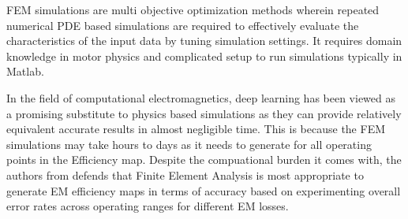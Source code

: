\documentclass{report} %
\begin{document}
\ac{FEM} simulations are multi objective optimization methods wherein repeated numerical \ac{PDE} based simulations
 are required to effectively evaluate the characteristics of the input data by tuning simulation settings. 
 It requires domain knowledge in motor physics and complicated setup to run simulations typically in Matlab.

In the field of computational electromagnetics, deep learning has been viewed as a promising substitute to physics based simulations as they can
provide relatively equivalent accurate results in almost negligible time. 
This is because the \ac{FEM} simulations may take hours to days as it needs to generate for all operating points in the Efficiency map.
Despite the compuational burden it comes with, the authors from \cite{FEA-ETA-2017} defends that Finite Element Analysis is most appropriate to 
generate \ac{EM} efficiency maps  in terms of accuracy based on experimenting overall error rates across operating ranges for different \ac{EM} losses.






\end{document}
